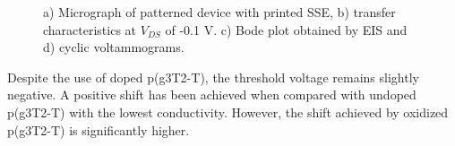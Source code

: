 \begin{figure}[ht]
    \centering
    \qquad
    \caption[Performance of solid-OECT with doped-p(g3T2-T)]{a) Micrograph of patterned device with printed SSE, b) transfer characteristics at $V_{DS}$ of -0.1 V. c) Bode plot obtained by EIS and d) cyclic voltammograms.}
    \label{fig:dopedSSE}
\end{figure}

Despite the use of doped p(g3T2-T), the threshold voltage remains slightly negative. A positive shift has been achieved when compared with undoped p(g3T2-T) with the lowest conductivity. However, the shift achieved by oxidized p(g3T2-T) is significantly higher. 


